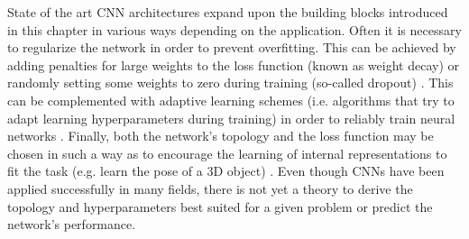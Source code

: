 State of the art CNN architectures expand upon the building blocks introduced in this chapter in various ways depending on the application. Often it is necessary to regularize the network in order to prevent overfitting. This can be achieved by adding penalties for large weights to the loss function (known as weight decay) or randomly setting some weights to zero during training (so-called dropout) \cite{srivastava2014dropout,pmlr-v28-wan13,krogh1992simple,treadgold1998simulated}. This can be complemented with adaptive learning schemes (i.e. algorithms that try to adapt learning hyperparameters during training) in order to reliably train neural networks \cite{zeiler2012adadelta,duchi2011adaptive,kingma2014adam,polyak1992acceleration,graves2013generating,sutskever2013importance,loshchilov2016sgdr}. Finally, both the network's topology and the loss function may be chosen in such a way as to encourage the learning of internal representations to fit the task (e.g. learn the pose of a 3D object) \cite{worrall2018cubenet,worrall2017harmonic,schmidt2012learning,cohen2016group}. Even though CNNs have been applied successfully in many fields, there is not yet a theory to derive the topology and hyperparameters best suited for a given problem or predict the network's performance.

